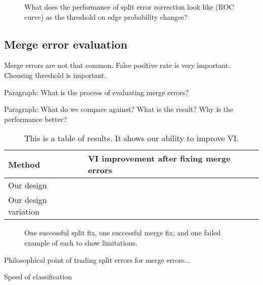 \begin{figure}[t]
\missingfigure{}
\caption{What does the performance of split error correction look like (ROC curve) as the threshold on edge probability changes?}
\end{figure}

\subsection{Merge error evaluation}

Merge errors are not that common. False positive rate is very important. Choosing threshold is important.

Paragraph: What is the process of evaluating merge errors?

Paragraph: What do we compare against? What is the result? Why is the performance better?

\begin{table}[t]
\begin{tabular}{ll}
\toprule
Method & VI improvement after fixing merge errors \\
\midrule
Our design &  \\
Our design variation & \\
\bottomrule
\end{tabular}
\caption{This is a table of results. It shows our ability to improve VI.}
\end{table}

\begin{figure}[t]
\caption{One successful split fix, one successful merge fix, and one failed example of each to show limitations.}
\end{figure}

Philosophical point of trading split errors for merge errors...


Speed of classification